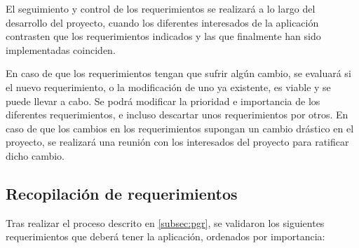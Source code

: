El seguimiento y control de los requerimientos se realizará a lo largo del
desarrollo del proyecto, cuando los diferentes interesados de la aplicación
contrasten que los requerimientos indicados y las que finalmente han sido
implementadas coinciden.

En caso de que los requerimientos tengan que sufrir algún cambio, se
evaluará si el nuevo requerimiento, o la modificación de uno ya existente,
es viable y se puede llevar a cabo. Se podrá modificar la prioridad e
importancia de los diferentes requerimientos, e incluso descartar unos
requerimientos por otros. En caso de que los cambios en los requerimientos
supongan un cambio drástico en el proyecto, se realizará una reunión con
los interesados del proyecto para ratificar dicho cambio.

\subsection{Recopilación de requerimientos}
\label{subsec:rdr}
Tras realizar el proceso descrito en \ref{subsec:pgr}, se validaron los
siguientes requerimientos que deberá tener la aplicación, ordenados por 
importancia:

